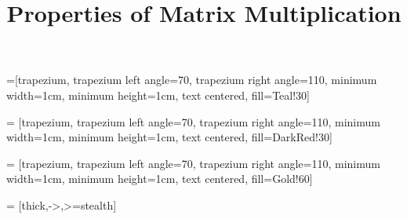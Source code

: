 









    






\title{Properties of Matrix Multiplication}
\subtitle{\SubTitleName}
\institute[]{\Course}
\author{\Instructor}
\maketitle


 =[trapezium, trapezium left angle=70, trapezium right angle=110, minimum width=1cm, minimum height=1cm, text centered, fill=Teal!30]

 = [trapezium, trapezium left angle=70, trapezium right angle=110, minimum width=1cm, minimum height=1cm, text centered, fill=DarkRed!30]

 = [trapezium, trapezium left angle=70, trapezium right angle=110, minimum width=1cm, minimum height=1cm, text centered, fill=Gold!60]

 = [thick,->,>=stealth]

